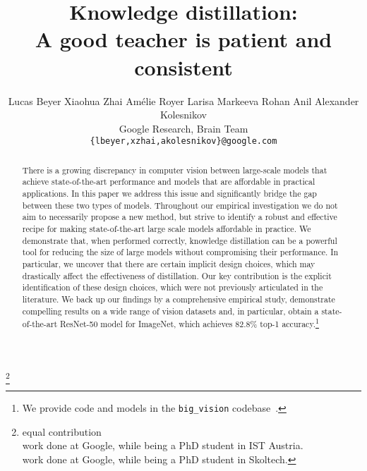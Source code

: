 \documentclass[10pt,twocolumn,letterpaper]{article}
\newcommand{\authsep}{\;\;}
\begin{document}
\title{Knowledge distillation:\\
A good teacher is patient and consistent}

\author{Lucas Beyer \authsep Xiaohua Zhai \authsep Amélie Royer \authsep Larisa Markeeva \authsep Rohan Anil \authsep Alexander Kolesnikov \\
Google Research, Brain Team \\
\texttt{\{lbeyer,xzhai,akolesnikov\}@google.com}}
\maketitle
{\let\thefootnote\relax\footnote{
{equal contribution \\  work done at Google, while being a PhD student in IST Austria. \\  work done at Google, while being a PhD student in Skoltech.}}}

\begin{abstract}
There is a growing discrepancy in computer vision between large-scale models that achieve state-of-the-art performance and models that are affordable in practical applications. In this paper we address this issue and significantly bridge the gap between these two types of models. Throughout our empirical investigation we do not aim to necessarily propose a new method, but strive to identify a robust and effective recipe for making state-of-the-art large scale models affordable in practice. We demonstrate that, when performed correctly, knowledge distillation can be a powerful tool for reducing the size of large models without compromising their performance. In particular, we uncover that there are certain implicit design choices, which may drastically affect the effectiveness of distillation. Our key contribution is the explicit identification of these design choices, which were not previously articulated in the literature. We back up our findings by a comprehensive empirical study, demonstrate compelling results on a wide range of vision datasets and, in particular, obtain a state-of-the-art ResNet-50 model for ImageNet, which achieves 82.8\% top-1 accuracy.\footnote{We provide code and models in the {\tt big\_vision} codebase~\cite{big_vision}.}  
\end{abstract}
\end{document}
